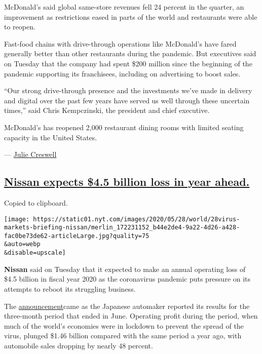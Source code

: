 McDonald's said global same-store revenues fell 24 percent in the
quarter, an improvement as restrictions eased in parts of the world and
restaurants were able to reopen.

Fast-food chains with drive-through operations like McDonald's have
fared generally better than other restaurants during the pandemic. But
executives said on Tuesday that the company had spent \$200 million
since the beginning of the pandemic supporting its franchisees,
including on advertising to boost sales.

``Our strong drive-through presence and the investments we've made in
delivery and digital over the past few years have served us well through
these uncertain times,'' said Chris Kempczinski, the president and chief
executive.

McDonald's has reopened 2,000 restaurant dining rooms with limited
seating capacity in the United States.

--- \href{https://www.nytimes.com/by/julie-creswell}{Julie Creswell}

\hypertarget{nissan-expects-45-billion-loss-in-year-ahead}{%
\subsection{\texorpdfstring{\protect\hyperlink{nissan-expects-4-5-billion-loss-in-year-ahead}{Nissan
expects \$4.5 billion loss in year
ahead.}}{Nissan expects \$4.5 billion loss in year ahead.}}\label{nissan-expects-45-billion-loss-in-year-ahead}}

Copied to clipboard.

\texttt{[image: https://static01.nyt.com/images/2020/05/28/world/28virus-markets-briefing-nissan/merlin\_172231152\_b44e2de4-9a22-4d26-a428-fac0be73de62-articleLarge.jpg?quality=75\\\&auto=webp\\\&disable=upscale]}

\textbf{Nissan} said on Tuesday that it expected to make an annual
operating loss of \$4.5 billion in fiscal year 2020 as the coronavirus
pandemic puts pressure on its attempts to reboot its struggling
business.

The
\href{https://global.nissannews.com/en/releases/200728-03-e}{announcement}came
as the Japanese automaker reported its results for the three-month
period that ended in June. Operating profit during the period, when much
of the world's economies were in lockdown to prevent the spread of the
virus, plunged \$1.46 billion compared with the same period a year ago,
with automobile sales dropping by nearly 48 percent.

